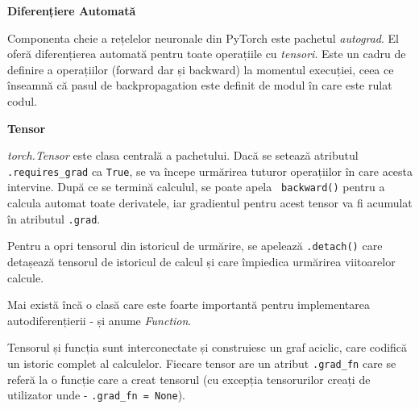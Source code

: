 \textbf{Diferențiere Automată}

Componenta cheie a rețelelor neuronale din PyTorch este pachetul \textit{autograd}. El oferă diferențierea automată pentru toate operațiile cu \textit{tensori}. Este un cadru de definire a operațiilor (forward dar și backward) la momentul execuției, ceea ce înseamnă că pasul de backpropagation este definit de modul în care este rulat codul.

\textbf{Tensor}

\textit{torch.Tensor} este clasa centrală a pachetului. Dacă se setează atributul \texttt{.requires\_grad} ca  \texttt{True}, se va începe urmărirea tuturor operațiilor în care acesta intervine. După ce se termină calculul, se poate apela \texttt{ backward()} pentru a calcula automat toate derivatele, iar gradientul pentru acest tensor va fi acumulat în atributul \texttt{.grad}.

Pentru a opri tensorul din istoricul de urmărire, se apelează \texttt{.detach()} care detașează tensorul de istoricul de calcul și care împiedica urmărirea viitoarelor calcule.

Mai există încă o clasă care este foarte importantă pentru implementarea autodiferențierii - și anume \textit{Function}.

Tensorul și funcția sunt interconectate și construiesc un graf aciclic, care codifică un istoric complet al calculelor. Fiecare tensor are un atribut  \texttt{.grad\_fn} care se referă la o funcție care a creat tensorul (cu excepția tensorurilor creați de utilizator unde - \texttt{.grad\_fn = None}).